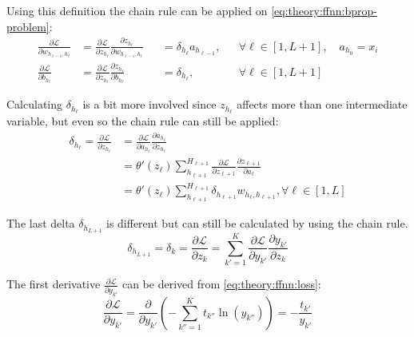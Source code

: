 Using this definition the chain rule can be applied on \eqref{eq:theory:ffnn:bprop-problem}:
\begin{equation}
\begin{align}
\frac{\partial \mathcal{L}}{\partial w_{h_{\ell-1}, h_\ell}} &= \frac{\partial \mathcal{L}}{\partial z_{h_\ell}} \frac{\partial z_{h_\ell}}{\partial w_{h_{\ell-1}, h_\ell}} &&= \delta_{h_\ell} a_{h_{\ell-1}},&& \forall \ell \in [1, L+1],\quad a_{h_0} = x_i \\
\frac{\partial \mathcal{L}}{\partial b_{h_\ell}} &= \frac{\partial \mathcal{L}}{\partial z_{h_\ell}} \frac{\partial z_{h_\ell}}{\partial b_{h_\ell}} &&= \delta_{h_\ell},&& \forall \ell \in [1, L+1]
\end{align}
\end{equation}


Calculating $\delta_{h_\ell}$ is a bit more involved since $z_{h_\ell}$ affects more than one intermediate variable, but even so the chain rule can still be applied:
\begin{equation}
\begin{aligned}
\delta_{h_\ell} = \frac{\partial \mathcal{L}}{\partial z_{h_\ell}} &= \frac{\partial \mathcal{L}}{\partial a_{h_\ell}} \frac{\partial a_{h_\ell}}{\partial z_{h_\ell}} \\
&= \theta'(z_\ell) \sum_{h_{\ell+1}}^{H_{\ell+1}} \frac{\partial \mathcal{L}}{\partial z_{\ell+1}} \frac{\partial z_{\ell+1}}{\partial a_\ell} \\
&= \theta'(z_\ell) \sum_{h_{\ell+1}}^{H_{\ell+1}} \delta_{h_{\ell+1}} w_{h_\ell, h_{\ell+1}}, \forall \ell \in [1, L]
\end{aligned}
\label{eq:theory:ffnn:bprop}
\end{equation}

The last delta $\delta_{h_{L+1}}$ is different but can still be calculated by using the chain rule.
\begin{equation}
\delta_{h_{L + 1}} = \delta_k = \frac{\partial \mathcal{L}}{\partial z_k} = \sum_{k'=1}^K \frac{\partial \mathcal{L}}{\partial y_{k'}} \frac{\partial y_{k'}}{\partial z_k}
\label{eq:theory:ffnn:bprop-deltaK}
\end{equation}

The first derivative $\frac{\partial \mathcal{L}}{\partial y_{k'}}$ can be derived from \eqref{eq:theory:ffnn:loss}:
\begin{equation}
\frac{\partial \mathcal{L}}{\partial y_{k'}} = \frac{\partial}{\partial y_{k'}} \left(- \sum_{k''=1}^K t_{k''} \ln(y_{k''})\right) = -\frac{t_{k'}}{y_{k'}}
\label{eq:theory:ffnn:bprop-Ldy}
\end{equation}

